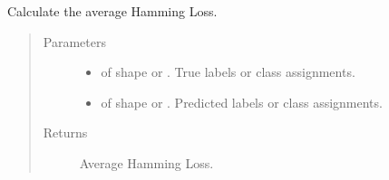 \documentclass[letterpaper,10pt,english]{sphinxmanual}
\begin{document}
\begin{fulllineitems}
\label{\detokenize{pusion.evaluation.evaluation_metrics:pusion.evaluation.evaluation_metrics.hamming}}
\sphinxAtStartPar
Calculate the average Hamming Loss.
\begin{quote}\begin{description}
\item[{Parameters}] \leavevmode\begin{itemize}
\item {} 
\sphinxAtStartPar
{} \textendash{}  of shape  or . True labels or class assignments.

\item {} 
\sphinxAtStartPar
{} \textendash{}  of shape  or . Predicted labels or
class assignments.

\end{itemize}

\item[{Returns}] \leavevmode
\sphinxAtStartPar
Average Hamming Loss.

\end{description}\end{quote}

\end{fulllineitems}

\end{document}
